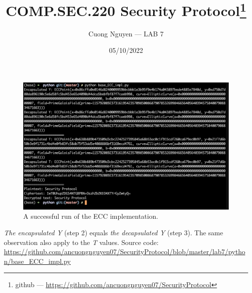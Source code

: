 \documentclass{article}
\title{COMP.SEC.220 Security Protocol\footnote{github --- \url{https://github.com/ancuongnguyen07/SecurityProtocol}}}
\author{Cuong Nguyen --- LAB 7}
\date{05/10/2022}
\begin{document}
    
\maketitle

\begin{figure}[hpt]
    \centering
    \includegraphics[height=\textheight,width=\textwidth,keepaspectratio
                    ]{sucessful_run.png}
    \caption{A successful run of the ECC implementation.}
\end{figure}

\emph{The encapsulated Y} (step 2) equals \emph{the decapsulated Y} (step 3).
The same observation also apply to the \emph{T} values. Source code:
\url{https://github.com/ancuongnguyen07/SecurityProtocol/blob/master/lab7/python/base_ECC_impl.py}
\end{document}
